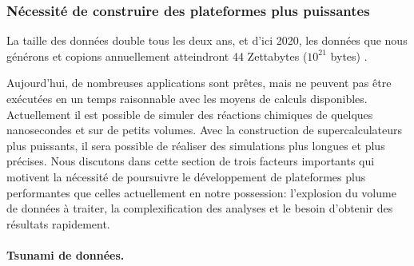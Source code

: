          
    \subsubsection{Nécessité de construire des plateformes plus puissantes}\label{sec:3_motivations}

        \begin{fancyquotes}
        La taille des données double tous les deux ans, et d'ici 2020, les données que nous générons et copions annuellement atteindront 44 Zettabytes ($10^{21}$ bytes) \cite{Zhang2017}.
        \end{fancyquotes}
    
        Aujourd'hui, de nombreuses applications sont prêtes, mais ne peuvent pas être exécutées en un temps raisonnable avec les moyens de calculs disponibles. Actuellement il est possible de simuler des réactions chimiques de quelques nanosecondes et sur de petits volumes. Avec la construction de supercalculateurs plus puissants, il sera possible de réaliser des simulations plus longues et plus précises. Nous discutons dans cette section de trois facteurs importants qui motivent la nécessité de poursuivre le développement de plateformes plus performantes que celles actuellement en notre possession: l'explosion du volume de données à traiter, la complexification des analyses et le besoin d'obtenir des résultats rapidement.

        
        \paragraph{Tsunami de données.} 
            
